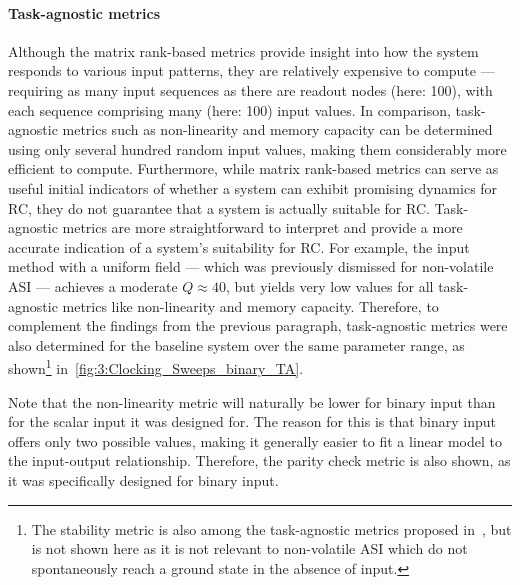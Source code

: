 \paragraph{Task-agnostic metrics}
Although the matrix rank-based metrics provide insight into how the system responds to various input patterns, they are relatively expensive to compute --- requiring as many input sequences as there are readout nodes (here: 100), with each sequence comprising many (here: 100) input values.
In comparison, task-agnostic metrics such as non-linearity and memory capacity can be determined using only several hundred random input values, making them considerably more efficient to compute.
Furthermore, while matrix rank-based metrics can serve as useful initial indicators of whether a system can exhibit promising dynamics for RC, they do not guarantee that a system is actually suitable for RC.
Task-agnostic metrics are more straightforward to interpret and provide a more accurate indication of a system's suitability for RC.
For example, the input method with a uniform field --- which was previously dismissed for non-volatile ASI --- achieves a moderate $Q \approx 40$, but yields very low values for all task-agnostic metrics like non-linearity and memory capacity. %
Therefore, to complement the findings from the previous paragraph, task-agnostic metrics were also determined for the baseline system over the same parameter range, as shown\footnote{
	The stability metric is also among the task-agnostic metrics proposed in~\cite{RC_TaskAgnosticMetrics_v2}, but is not shown here as it is not relevant to non-volatile ASI which do not spontaneously reach a ground state in the absence of input.
} in~\cref{fig:3:Clocking_Sweeps_binary_TA}. \par
Note that the non-linearity metric will naturally be lower for binary input than for the scalar input it was designed for.
The reason for this is that binary input offers only two possible values, making it generally easier to fit a linear model to the input-output relationship.
Therefore, the parity check metric is also shown, as it was specifically designed for binary input. %


